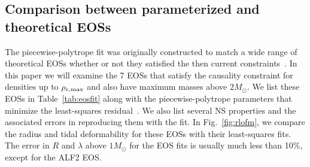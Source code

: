 \documentclass[twocolumn,prd,amssymb,aps,nofootinbib,showpacs,epsf]{revtex4}
\begin{document}
\subsection{Comparison between parameterized and theoretical EOSs}

The piecewise-polytrope fit was originally constructed to match a wide range of theoretical EOSs whether or not they satisfied the then current constraints~\cite{ReadLackey2009}. In this paper we will examine the 7 EOSs that satisfy the causality constraint for densities up to $\rho_{\rm c, max}$ and also have maximum masses above $2M_\odot$. We list these EOSs in Table~\ref{tab:eosfit} along with the piecewise-polytrope parameters that minimize the least-squares residual~\cite{ReadLackey2009}. We also list several NS properties and the associated errors in reproducing them with the fit. In Fig.~\ref{fig:rlofm}, we compare the radius and tidal deformability for these EOSs with their least-squares fits.  The error in $R$ and $\lambda$ above $1M_\odot$ for the EOS fits is usually much less than 10\%, except for the ALF2 EOS.
\end{document}
